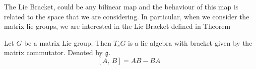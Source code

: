 \noindent
The Lie Bracket, could be any bilinear map and the behaviour of this map is related to the space that we are considering. In particular, when we consider the matrix lie groups, we are interested in the Lie Bracket defined in Theorem 

\begin{nthm}\label{ref:LBthm}
  Let $G$ be a matrix Lie group. Then $T_eG$ is a lie algebra with bracket given by the matrix commutator. Denoted by $\mathfrak{g}$.
  $$ [A,\, B] = AB - BA $$
\end{nthm}
